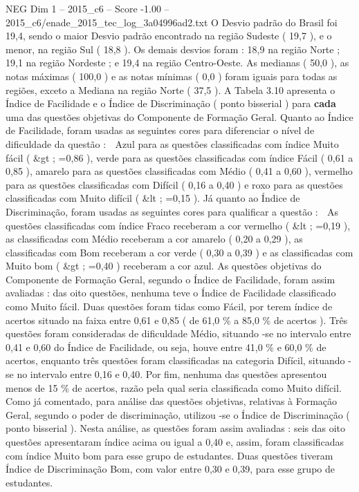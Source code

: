 \begin{textsample}{NEG Dim 1 – 2015\_c6 – Score -1.00 – 2015\_c6/enade\_2015\_tec\_log\_3a04996ad2.txt}
O Desvio padrão do Brasil foi 19,4, sendo o maior Desvio padrão encontrado na região Sudeste ( 19,7 ), e o menor, na região Sul ( 18,8 ).
Os demais desvios foram : 18,9 na região Norte ; 19,1 na região Nordeste ; e 19,4 na região Centro-Oeste.
As medianas ( 50,0 ), as notas máximas ( 100,0 ) e as notas mínimas ( 0,0 ) foram iguais para todas as regiões, exceto a Mediana na região Norte ( 37,5 ).
A Tabela 3.10 apresenta o Índice de Facilidade e o Índice de Discriminação ( ponto bisserial ) para \textbf{cada} uma das questões objetivas do Componente de Formação Geral.
Quanto ao Índice de Facilidade, foram usadas as seguintes cores para diferenciar o nível de dificuldade da questão :  Azul para as questões classificadas com índice Muito fácil ( \&gt ; =0,86 ), verde para as questões classificadas com índice Fácil ( 0,61 a 0,85 ), amarelo para as questões classificadas com Médio ( 0,41 a 0,60 ), vermelho para as questões classificadas com Difícil ( 0,16 a 0,40 ) e roxo para as questões classificadas com Muito difícil ( \&lt ; =0,15 ).
Já quanto ao Índice de Discriminação, foram usadas as seguintes cores para qualificar a questão :  As questões classificadas com índice Fraco receberam a cor vermelho ( \&lt ; =0,19 ), as classificadas com Médio receberam a cor amarelo ( 0,20 a 0,29 ), as classificadas com Bom receberam a cor verde ( 0,30 a 0,39 ) e as classificadas com Muito bom ( \&gt ; =0,40 ) receberam a cor azul.
As questões objetivas do Componente de Formação Geral, segundo o Índice de Facilidade, foram assim avaliadas : das oito questões, nenhuma teve o Índice de Facilidade classificado como Muito fácil.
Duas questões foram tidas como Fácil, por terem índice de acertos situado na faixa entre 0,61 e 0,85 ( de 61,0 \% a 85,0 \% de acertos ).
Três questões foram consideradas de dificuldade Médio, situando -se no intervalo entre 0,41 e 0,60 do Índice de Facilidade, ou seja, houve entre 41,0 \% e 60,0 \% de acertos, enquanto três questões foram classificadas na categoria Difícil, situando -se no intervalo entre 0,16 e 0,40.
Por fim, nenhuma das questões apresentou menos de 15 \% de acertos, razão pela qual seria classificada como Muito difícil.
Como já comentado, para análise das questões objetivas, relativas à Formação Geral, segundo o poder de discriminação, utilizou -se o Índice de Discriminação ( ponto bisserial ).
Nesta análise, as questões foram assim avaliadas : seis das oito questões apresentaram índice acima ou igual a 0,40 e, assim, foram classificadas com índice Muito bom para esse grupo de estudantes.
Duas questões tiveram Índice de Discriminação Bom, com valor entre 0,30 e 0,39, para esse grupo de estudantes.

\end{textsample}
